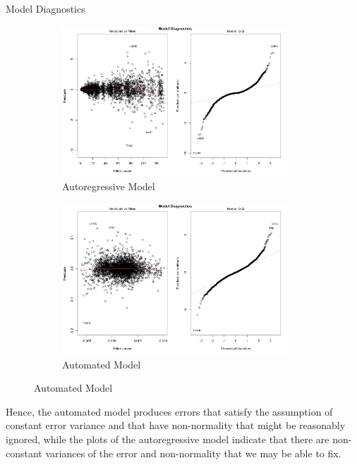\documentclass[]{article}
\begin{document}
\begin{section}{Model Diagnostics}
\begin{figure}[H]
\begin{subfigure}{.5\textwidth}
  \includegraphics[width=85mm]{diagnostics/arm_model_plots.png}
  \caption{Autoregressive Model}
\end{subfigure}%
\begin{subfigure}{.5\textwidth}
  \includegraphics[width=85mm]{diagnostics/fm_model_plots.png}
  \caption{Automated Model}
\end{subfigure}
\end{figure}

Hence, the automated model produces errors that satisfy the assumption of constant error variance and that have non-normality that might be reasonably ignored, while the plots of the autoregressive model indicate that there are non-constant variances of the error and non-normality that we may be able to fix.



\end{section}
\end{document}
